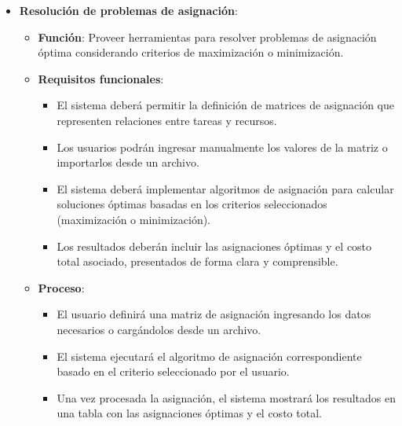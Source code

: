\documentclass[stu, 12pt, letterpaper, donotrepeattitle, floatsintext, natbib]{apa7}
\begin{document}
\begin{itemize}
    \item \textbf{Resolución de problemas de asignación}:
    \begin{itemize}
        \item \textbf{Función}: Proveer herramientas para resolver problemas de asignación óptima considerando criterios de maximización o minimización.
        \item \textbf{Requisitos funcionales}:
            \begin{itemize}
                \item El sistema deberá permitir la definición de matrices de asignación que representen relaciones entre tareas y recursos.
                \item Los usuarios podrán ingresar manualmente los valores de la matriz o importarlos desde un archivo.
                \item El sistema deberá implementar algoritmos de asignación para calcular soluciones óptimas basadas en los criterios seleccionados (maximización o minimización).
                \item Los resultados deberán incluir las asignaciones óptimas y el costo total asociado, presentados de forma clara y comprensible.
            \end{itemize}
        \item \textbf{Proceso}:
            \begin{itemize}
                \item El usuario definirá una matriz de asignación ingresando los datos necesarios o cargándolos desde un archivo.
                \item El sistema ejecutará el algoritmo de asignación correspondiente basado en el criterio seleccionado por el usuario.
                \item Una vez procesada la asignación, el sistema mostrará los resultados en una tabla con las asignaciones óptimas y el costo total.
            \end{itemize}
    \end{itemize}
    

\end{itemize}
\end{document}
